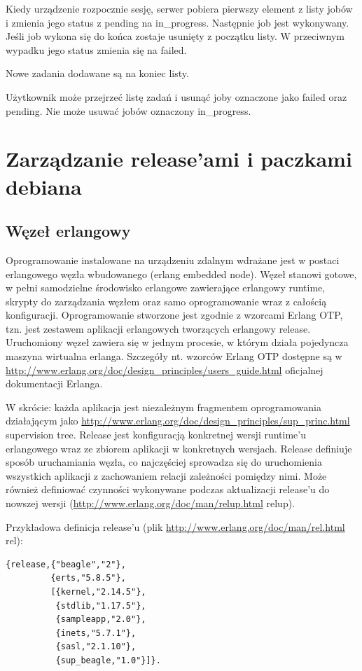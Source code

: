 \documentclass[polish,12pt]{aghthesis}
\begin{document}
Kiedy urządzenie rozpocznie sesję, serwer pobiera pierwszy element z listy jobów i zmienia jego status z pending na in\_progress. Następnie job jest wykonywany. Jeśli job wykona się do końca zostaje usunięty z początku listy. W przeciwnym wypadku jego status zmienia się na failed.

Nowe zadania dodawane są na koniec listy.

Użytkownik może przejrzeć listę zadań i usunąć joby oznaczone jako failed oraz pending. Nie może usuwać jobów oznaczony in\_progress.

\section{Zarządzanie release'ami i paczkami debiana}
\subsection{Węzeł erlangowy}
Oprogramowanie instalowane na urządzeniu zdalnym wdrażane jest w postaci erlangowego węzła wbudowanego (erlang embedded node). Węzeł stanowi gotowe, w pełni samodzielne środowisko erlangowe zawierające erlangowy runtime, skrypty do zarządzania węzłem oraz samo oprogramowanie wraz z całością konfiguracji. Oprogramowanie stworzone jest zgodnie z wzorcami Erlang OTP, tzn. jest zestawem aplikacji erlangowych tworzących erlangowy release. Uruchomiony węzeł zawiera się w jednym procesie, w którym działa pojedyncza maszyna wirtualna erlanga. Szczegóły nt. wzorców Erlang OTP dostępne są w  \url{http://www.erlang.org/doc/design_principles/users_guide.html} oficjalnej dokumentacji Erlanga.

W skrócie: każda aplikacja jest niezależnym fragmentem oprogramowania działającym jako \url{http://www.erlang.org/doc/design_principles/sup_princ.html} supervision tree. Release jest konfiguracją konkretnej wersji runtime'u erlangowego wraz ze zbiorem aplikacji w konkretnych wersjach. Release definiuje sposób uruchamiania węzła, co najczęściej sprowadza się do uruchomienia wszystkich aplikacji z zachowaniem relacji zależności pomiędzy nimi. Może również definiować czynności wykonywane podczas aktualizacji release'u do nowszej wersji (\url{http://www.erlang.org/doc/man/relup.html} relup).

Przykładowa definicja release'u (plik \url{http://www.erlang.org/doc/man/rel.html} rel):

\begin{verbatim}
{release,{"beagle","2"},
         {erts,"5.8.5"},
         [{kernel,"2.14.5"},
          {stdlib,"1.17.5"},
          {sampleapp,"2.0"},
          {inets,"5.7.1"},
          {sasl,"2.1.10"},
          {sup_beagle,"1.0"}]}.
\end{verbatim}
\end{document}
